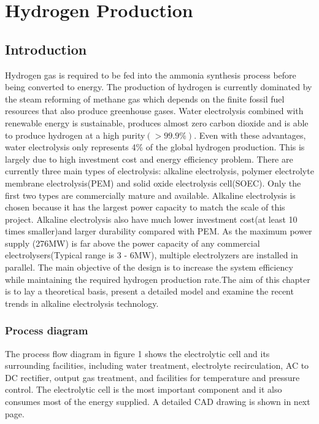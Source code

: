 


% 

\section{Hydrogen Production}
\subsection{Introduction} 


Hydrogen gas is required to be fed into the ammonia synthesis process before being converted to energy. The production of hydrogen is currently dominated by the steam reforming of methane gas which depends on the finite fossil fuel resources that also produce greenhouse gases. Water electrolysis combined with renewable energy is sustainable, produces almost zero carbon dioxide and is able to produce hydrogen at a high purity$(>99.9\%)$. Even with these advantages, water electrolysis only represents 4\% of the global hydrogen production. This is largely due to high investment cost and energy efficiency problem. There are currently three main types of electrolysis: alkaline electrolysis, polymer electrolyte membrane electrolysis(PEM) and solid oxide electrolysis cell(SOEC). Only the first two types are commercially mature and available. Alkaline electrolysis is chosen because it has the largest power capacity to match the scale of this project. Alkaline electrolysis also have much lower investment cost(at least 10 times smaller)and larger durability compared with PEM. As the maximum power supply (276MW) is far above the power capacity of any commercial electrolysers(Typical range is 3 - 6MW), multiple electrolyzers are installed in parallel.
The main objective of the design is to increase the system efficiency while maintaining the required hydrogen production rate.The aim of this chapter is to lay a theoretical basis, present a detailed model  and examine the recent trends in alkaline electrolysis technology. 

\subsubsection{Process diagram} 
The process flow diagram in figure 1 shows the electrolytic cell and its surrounding facilities, including water treatment, electrolyte recirculation, AC to DC rectifier, output gas treatment, and facilities for temperature and pressure control. The electrolytic cell is the most important component and it also consumes most of the energy supplied. A detailed CAD drawing is shown in next page.

